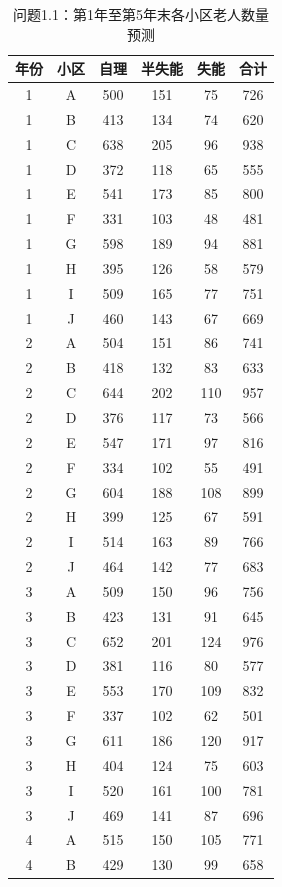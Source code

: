 \begin{table}[h]
\centering
\caption{问题1.1：第1年至第5年末各小区老人数量预测}
\begin{tabular}{|c|c|c|c|c|c|}
\hline
年份 & 小区 & 自理 & 半失能 & 失能 & 合计 \\
\hline
1 & A & 500 & 151 & 75 & 726 \\
1 & B & 413 & 134 & 74 & 620 \\
1 & C & 638 & 205 & 96 & 938 \\
1 & D & 372 & 118 & 65 & 555 \\
1 & E & 541 & 173 & 85 & 800 \\
1 & F & 331 & 103 & 48 & 481 \\
1 & G & 598 & 189 & 94 & 881 \\
1 & H & 395 & 126 & 58 & 579 \\
1 & I & 509 & 165 & 77 & 751 \\
1 & J & 460 & 143 & 67 & 669 \\
2 & A & 504 & 151 & 86 & 741 \\
2 & B & 418 & 132 & 83 & 633 \\
2 & C & 644 & 202 & 110 & 957 \\
2 & D & 376 & 117 & 73 & 566 \\
2 & E & 547 & 171 & 97 & 816 \\
2 & F & 334 & 102 & 55 & 491 \\
2 & G & 604 & 188 & 108 & 899 \\
2 & H & 399 & 125 & 67 & 591 \\
2 & I & 514 & 163 & 89 & 766 \\
2 & J & 464 & 142 & 77 & 683 \\
3 & A & 509 & 150 & 96 & 756 \\
3 & B & 423 & 131 & 91 & 645 \\
3 & C & 652 & 201 & 124 & 976 \\
3 & D & 381 & 116 & 80 & 577 \\
3 & E & 553 & 170 & 109 & 832 \\
3 & F & 337 & 102 & 62 & 501 \\
3 & G & 611 & 186 & 120 & 917 \\
3 & H & 404 & 124 & 75 & 603 \\
3 & I & 520 & 161 & 100 & 781 \\
3 & J & 469 & 141 & 87 & 696 \\
4 & A & 515 & 150 & 105 & 771 \\
4 & B & 429 & 130 & 99 & 658 \\

\end{tabular}
\end{table}
